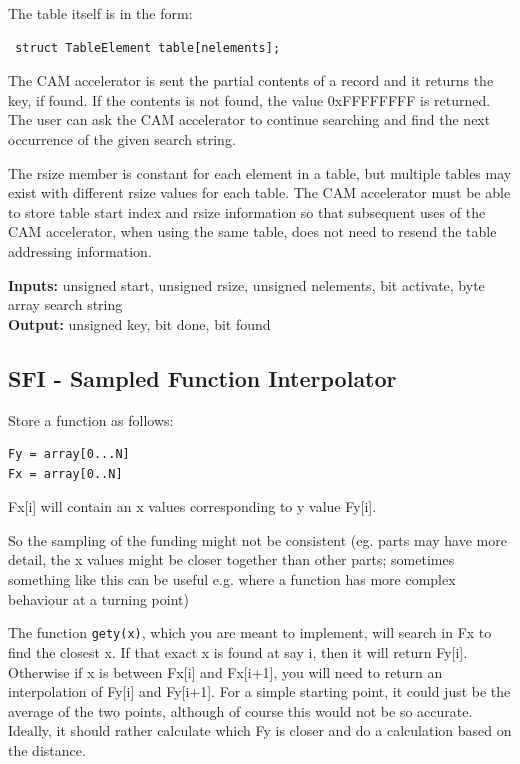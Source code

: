 The table itself is in the form:
\begin{lstlisting}
 struct TableElement table[nelements];
\end{lstlisting}

The CAM accelerator is sent the partial contents of a record and it returns the key, if found. If the contents is not found, the value 0xFFFFFFFF is returned. The user can ask the CAM accelerator to continue searching and find the next occurrence of the given search string.

The rsize member is constant for each element in a table, but multiple tables may exist with different rsize values for each table. The CAM accelerator must be able to store table start index and rsize information so that subsequent uses of the CAM accelerator, when using the same table, does not need to resend the table addressing information.

\textbf{Inputs:} unsigned start, unsigned rsize, unsigned nelements, bit activate, byte array search string\\
\textbf{Output:} unsigned key, bit done, bit found

\subsection{SFI - Sampled Function Interpolator}

Store a function as follows:
\begin{lstlisting}
Fy = array[0...N]
Fx = array[0..N]
\end{lstlisting}
Fx[i] will contain an x values corresponding to y value Fy[i]. 

So the sampling of the funding might not be consistent (eg. parts may have more detail, the x values might be closer together than other parts; sometimes something like this can be useful e.g. where a function has more complex behaviour at a turning point)

The function  \verb|gety(x)|,  which you are meant to implement, will search in Fx to find the closest x. If that exact x is found at say i, then it will return Fy[i]. Otherwise if x is between Fx[i] and Fx[i+1], you will need to return an interpolation of Fy[i] and Fy[i+1].  For a simple starting point, it could just be the average of the two points, although of course this would not be so accurate. Ideally, it should rather calculate which Fy is closer and do a calculation based on the distance.



